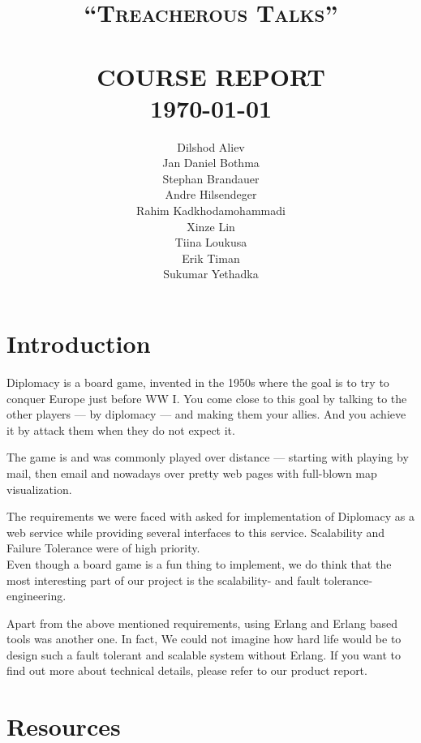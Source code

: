 \documentclass[11pt,a4paper]{report}
\title{    \normalsize \textsc{``Treacherous Talks''} %
             \\[2.0cm]                                %
            \HRule{0.5pt} \\                          %
            \LARGE \textbf{\uppercase{Course Report}} %
            \HRule{2pt} \\ [0.5cm]                    %
            \normalsize \today                        %
        }
\author{Dilshod Aliev\\
        Jan Daniel Bothma\\
        Stephan Brandauer\\
        Andre Hilsendeger\\
        Rahim Kadkhodamohammadi\\
        Xinze Lin\\
        Tiina Loukusa\\
        Erik Timan\\
        Sukumar Yethadka\\
        }
\makeatletter
\def\printtitle{
    {\centering \@title\par}}
\def\printauthor{
    {\centering \large \@author}}
\makeatother
\begin{document}
\thispagestyle{empty}                %

\printtitle
\vfill
\printauthor

\tableofcontents

\chapter{Introduction}
Diplomacy is a board game, invented in the 1950s where the goal is to try to
conquer Europe just before WW I. You come close to this goal by talking to the
other players --- by diplomacy --- and making them your allies. And you achieve
it by attack them when they do not expect it.

The game is and was commonly played over distance --- starting with playing by
mail, then email and nowadays over pretty web pages with full-blown map
visualization.

The requirements we were faced with asked for implementation of Diplomacy as a
web service while providing several interfaces to this service. Scalability and
Failure Tolerance were of high priority. \\
Even though a board game is a fun thing to implement, we do think that the most
interesting part of our project is the scalability- and fault tolerance-
engineering.

Apart from the above mentioned requirements, using Erlang\cite{erlang_proglang}
and Erlang based tools was another one. 
In fact, We could not imagine how hard life would be 
to design such a fault tolerant and scalable system without Erlang. If you want
to find out more about technical details, please refer to our product report.

\chapter{Resources}
\end{document}
